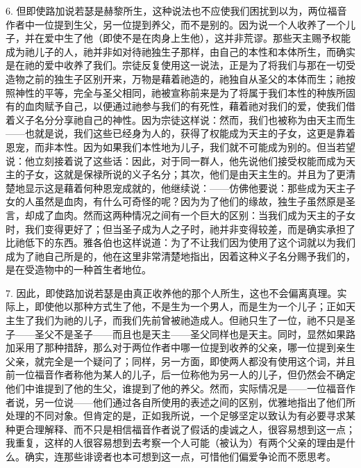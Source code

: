 6. 但即使路加说若瑟是赫黎所生，这种说法也不应使我们困扰到以为，两位福音作者中一位提到生父，另一位提到养父，而不是别的。因为说一个人收养了一个儿子，并在爱中生了他（即使不是在肉身上生他），这并非荒谬。那些天主赐予权能成为祂儿子的人，祂并非如对待祂独生子那样，由自己的本性和本体所生，而确实是在祂的爱中收养了我们。宗徒反复使用这一说法，正是为了将我们与那在一切受造物之前的独生子区别开来，万物是藉着祂造的，祂独自从圣父的本体而生；祂按照神性的平等，完全与圣父相同，祂被宣称前来是为了将属于我们本性的种族所固有的血肉赋予自己，以便通过祂参与我们的有死性，藉着祂对我们的爱，使我们借着义子名分分享祂自己的神性。因为宗徒这样说：然而，我们也被称为由天主而生——也就是说，我们这些已经身为人的，获得了权能成为天主的子女，这更是靠着恩宠，而非本性。因为如果我们本性地为儿子，我们就不可能成为别的。但当若望说：他立刻接着说了这些话：因此，对于同一群人，他先说他们接受权能而成为天主的子女，这就是保禄所说的义子名分；其次，他们是由天主生的。并且为了更清楚地显示这是藉着何种恩宠成就的，他继续说：——仿佛他要说：那些成为天主子女的人虽然是血肉，有什么可奇怪的呢？因为为了他们的缘故，独生子虽然原是圣言，却成了血肉。然而这两种情况之间有一个巨大的区别：当我们成为天主的子女时，我们变得更好了；但当圣子成为人之子时，祂并非变得较差，而是确实承担了比祂低下的东西。雅各伯也这样说道：为了不让我们因为使用了这个词就以为我们成为了祂自己所是的，他在这里非常清楚地指出，因着这种义子名分赐予我们的，是在受造物中的一种首生者地位。\par

7. 因此，即使路加说若瑟是由真正收养他的那个人所生，这也不会偏离真理。实际上，即使他以那种方式生了他，不是生为一个男人，而是生为一个儿子；正如天主生了我们为祂的儿子，而我们先前曾被祂造成人。但祂只生了一位，祂不只是圣子——圣父不是圣子——而且也是天主——圣父同样也是天主。同时，显然如果路加采用了那种措辞，那么对于两位作者中哪一位提到收养的父亲，哪一位提到亲生父亲，就完全是一个疑问了；同样，另一方面，即使两人都没有使用这个词，并且前一位福音作者称他为某人的儿子，后一位称他为另一人的儿子，但仍然会不确定他们中谁提到了他的生父，谁提到了他的养父。然而，实际情况是——一位福音作者说，另一位说——他们通过各自所使用的表述之间的区别，优雅地指出了他们所处理的不同对象。但肯定的是，正如我所说，一个足够坚定以致认为有必要寻求某种更合理解释、而不只是相信福音作者说了假话的虔诚之人，很容易想到这一点；我重复，这样的人很容易想到去考察一个人可能（被认为）有两个父亲的理由是什么。确实，连那些诽谤者也本可想到这一点，可惜他们偏爱争论而不愿思考。\par


